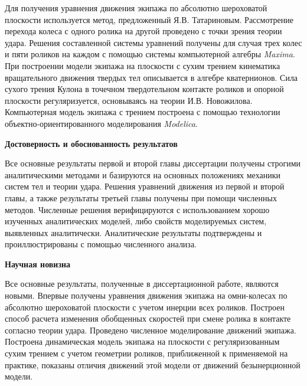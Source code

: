 Для получения уравнения движения экипажа по абсолютно шероховатой плоскости используется метод, предложенный Я.В. Татариновым. Рассмотрение перехода колеса с одного ролика на другой проведено с точки зрения теории удара. Решения составленной системы уравнений получены для случая трех колес и пяти роликов на каждом с помощью системы компьютерной алгебры \textit{Maxima}. При построении модели экипажа на плоскости с сухим трением кинематика вращательного движения твердых тел описывается в алгебре кватернионов. Сила сухого трения Кулона в точечном твердотельном контакте роликов и опорной плоскости регуляризуется, основываясь на теории И.В. Новожилова. Компьютерная модель экипажа с трением построена с помощью технологии объектно-ориентированного моделирования \textit{Modelica}.

\textbf{Достоверность и обоснованность результатов}

Все основные результаты первой и второй главы диссертации получены строгими аналитическими методами и базируются на основных положениях механики систем тел и теории удара. Решения уравнений движения из первой и второй главы, а также результаты третьей главы получены при помощи численных методов.
Численные решения верифицируются с использованием хорошо изученных аналитических моделей, либо свойств моделируемых систем, выявленных аналитически. Аналитические результаты подтверждены и проиллюстрированы с помощью численного анализа.

\textbf{Научная новизна}

Все основные результаты, полученные в диссертационной  работе, являются новыми. Впервые получены уравнения движения экипажа на омни-колесах по абсолютно шероховатой плоскости с учетом инерции всех роликов. Построен способ расчета изменения обобщенных скоростей при смене ролика в контакте согласно теории удара. Проведено численное моделирование движений экипажа. Построена динамическая модель экипажа на плоскости с регуляризованным сухим трением с учетом геометрии роликов, приближенной к применяемой на практике, показаны отличия движений этой модели от движений безынерционной модели.

